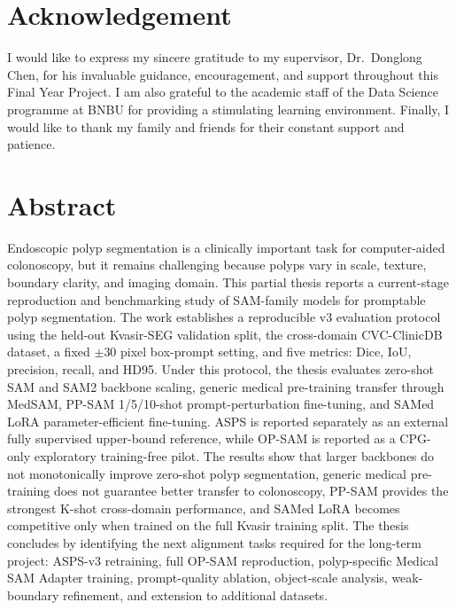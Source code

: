 \documentclass[11pt,a4paper,oneside]{report}
\begin{document}
\chapter*{Acknowledgement}
\thispagestyle{plain}

I would like to express my sincere gratitude to my supervisor, Dr.\ Donglong
Chen, for his invaluable guidance, encouragement, and support throughout this
Final Year Project. I am also grateful to the academic staff of the Data
Science programme at BNBU for providing a stimulating learning environment.
Finally, I would like to thank my family and friends for their constant
support and patience.

\chapter*{Abstract}
\thispagestyle{plain}

\noindent Endoscopic polyp segmentation is a clinically important task for
computer-aided colonoscopy, but it remains challenging because polyps vary in
scale, texture, boundary clarity, and imaging domain. This partial thesis
reports a current-stage reproduction and benchmarking study of SAM-family
models for promptable polyp segmentation. The work establishes a reproducible
v3 evaluation protocol using the held-out Kvasir-SEG validation split, the
cross-domain CVC-ClinicDB dataset, a fixed $\pm30$ pixel box-prompt setting,
and five metrics: Dice, IoU, precision, recall, and HD95. Under this protocol,
the thesis evaluates zero-shot SAM and SAM2 backbone scaling, generic medical
pre-training transfer through MedSAM, PP-SAM 1/5/10-shot prompt-perturbation
fine-tuning, and SAMed LoRA parameter-efficient fine-tuning. ASPS is reported separately as an external fully supervised
upper-bound reference, while OP-SAM is reported as a CPG-only exploratory
training-free pilot. The results show that larger backbones do not monotonically
improve zero-shot polyp segmentation, generic medical pre-training does not
guarantee better transfer to colonoscopy, PP-SAM provides the strongest K-shot
cross-domain performance, and SAMed LoRA becomes competitive only when trained
on the full Kvasir training split. The thesis concludes by identifying the next
alignment tasks required for the long-term project: ASPS-v3 retraining, full
OP-SAM reproduction, polyp-specific Medical SAM Adapter training, prompt-quality
ablation, object-scale analysis, weak-boundary refinement, and extension to
additional datasets.
\end{document}
